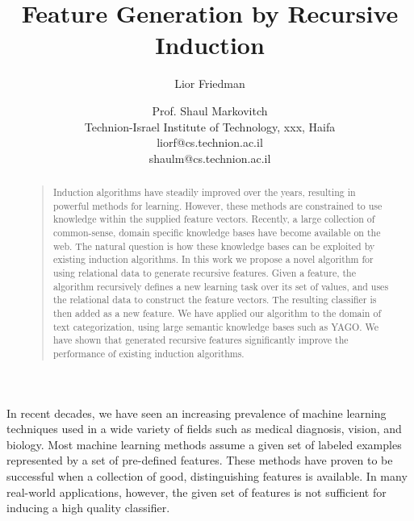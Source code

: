 \documentclass[letterpaper]{article}
\theoremstyle{definition}
\begin{document}

\title{Feature Generation by Recursive Induction}

\author{Lior Friedman \and Prof. Shaul Markovitch\\
Technion-Israel Institute of Technology, xxx, Haifa\\
liorf@cs.technion.ac.il  \\ shaulm@cs.technion.ac.il
}

\maketitle
\begin{abstract}
\begin{quote}
Induction algorithms have steadily improved over the years, resulting in powerful methods for learning. However, these methods are constrained to use knowledge within the supplied feature vectors. Recently, a large collection of common-sense, domain specific knowledge bases have become available on the web. The natural question is how these knowledge bases can be exploited by existing induction algorithms.
In this work we propose a novel algorithm for using relational data to generate recursive features. Given a feature, the algorithm recursively defines a new learning task over its set of values, and uses the relational data to construct the feature vectors. The resulting classifier is then added as a new feature.
We have applied our algorithm to the domain of text categorization, using large semantic knowledge bases such as YAGO. We have shown that generated recursive features significantly improve the performance of existing induction algorithms.
\end{quote}
\end{abstract}

\noindent %

\label{sec:Intro}
In recent decades, we have seen an increasing prevalence of machine learning techniques used in a wide variety of fields such as medical diagnosis, vision, and biology.
Most machine learning methods assume a given set of labeled examples represented by a set of
pre-defined features. These methods have proven to be successful when a collection of good,
distinguishing features is available.
In many real-world applications, however, the given set of features is not sufficient for inducing a high quality classifier.
\end{document}
